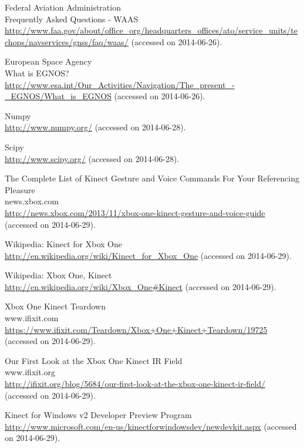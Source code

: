 \documentclass[12pt,a4paper,ngerman]{scrartcl}
\begin{document}
\begin{thebibliography}{99}
Federal Aviation Administration\\
Frequently Asked Questions - WAAS\\
\url{http://www.faa.gov/about/office_org/headquarters_offices/ato/service_units/techops/navservices/gnss/faq/waas/} (accessed on 2014-06-26).

European Space Agency\\
What is EGNOS?
\url{http://www.esa.int/Our_Activities/Navigation/The_present_-_EGNOS/What_is_EGNOS} (accessed on 2014-06-26).

Numpy\\
\url{http://www.numpy.org/} (accessed on 2014-06-28).

Scipy\\
\url{http://www.scipy.org/} (accessed on 2014-06-28).

The Complete List of Kinect Gesture and Voice Commands For Your Referencing Pleasure\\
news.xbox.com\\
\url{http://news.xbox.com/2013/11/xbox-one-kinect-gesture-and-voice-guide} (accessed on 2014-06-29).

Wikipedia: Kinect for Xbox One\\
\url{http://en.wikipedia.org/wiki/Kinect_for_Xbox_One} (accessed on 2014-06-29).

Wikipedia: Xbox One, Kinect\\
\url{http://en.wikipedia.org/wiki/Xbox_One#Kinect} (accessed on 2014-06-29).

Xbox One Kinect Teardown\\
www.ifixit.com\\
\url{https://www.ifixit.com/Teardown/Xbox+One+Kinect+Teardown/19725} (accessed on 2014-06-29).

Our First Look at the Xbox One Kinect IR Field\\
www.ifixit.org\\
\url{http://ifixit.org/blog/5684/our-first-look-at-the-xbox-one-kinect-ir-field/} (accessed on 2014-06-29).

Kinect for Windows v2 Developer Preview Program\\
\url{http://www.microsoft.com/en-us/kinectforwindowsdev/newdevkit.aspx} (accessed on 2014-06-29).

\end{thebibliography}
\end{document}
